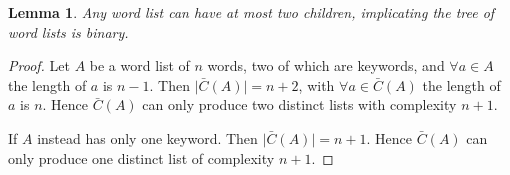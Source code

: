 \documentclass{article}
\newtheorem{lemma}[theorem]{Lemma}
\begin{document}
\newpage
\begin{lemma}
Any word list can have at most two children, implicating the tree of word lists is binary.
\end{lemma}
\begin{proof}
    Let $A$ be a word list of $n$ words, two of which are keywords, and $\forall a \in A$ the length of $a$ is $n-1$. Then $\Big | \bar C(A) \Big | =  n + 2$, with  $\forall a \in \bar C (A)$ the length of $a$ is $n$. Hence $\bar C (A)$ can only produce two distinct lists with complexity $n + 1$.

    If $A$ instead has only one keyword. Then $\Big | \bar C(A) \Big | = n + 1$. Hence $\bar C (A)$ can only produce one distinct list of complexity $n + 1$.
\end{proof}
\end{document}
